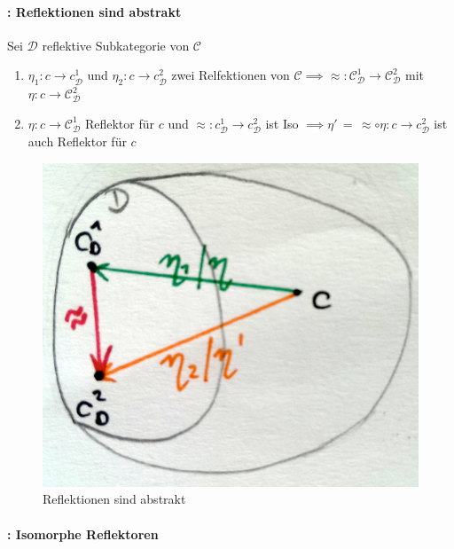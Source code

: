 \paragraph{: Reflektionen sind abstrakt}
Sei $\mathcal{D} $ reflektive Subkategorie von $\mathcal{C} $

\begin{enumerate}
\item $\eta_1: c \rightarrow c_\mathcal{D}^1 $ und $\eta_2: c \rightarrow c_\mathcal{D}^2 $ zwei Relfektionen von $\mathcal{C} \implies \approx: \mathcal{C}_\mathcal{D}^1 \rightarrow \mathcal{C}_\mathcal{D}^2 $ mit $\eta: c \rightarrow \mathcal{C}_\mathcal{D}^2$
\item  $\eta: c \rightarrow \mathcal{C}_\mathcal{D}^1$ Reflektor für $c$ und $\approx: c_\mathcal{D}^1 \rightarrow c_\mathcal{D}^2$ ist Iso $\implies \eta' \, = \, \approx \circ \eta : c \rightarrow c_\mathcal{D}^2$ ist auch Reflektor für $c$
\end{enumerate}

\begin{figure}[h]
\noindent \centering{}\includegraphics[scale=0.1]{Abbildungen/154}\caption{Reflektionen sind abstrakt}
\end{figure}

\paragraph{: Isomorphe Reflektoren}
 
